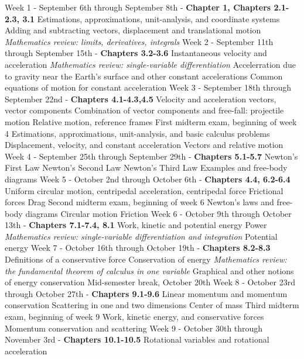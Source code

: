 \documentclass[10pt]{article}
\begin{document}
\begin{outline}[enumerate]
\1 Week 1 - September 6th through September 8th - \textbf{Chapter 1, Chapters 2.1-2.3, 3.1}
\2 Estimations, approximations, unit-analysis, and coordinate systems
\2 Adding and subtracting vectors, displacement and translational motion
\2 \textit{Mathematics review: limits, derivatives, integrals}
\1 Week 2 - September 11th through September 15th - \textbf{Chapters 3.2-3.6}
\2 Instantaneous velocity and acceleration
\3 \textit{Mathematics review: single-variable differentiation}
\2 Accelerration due to gravity near the Earth's surface and other constant accelerations
\2 Common equations of motion for constant acceleration	
\1 Week 3 - September 18th through September 22nd - \textbf{Chapters 4.1-4.3,4.5}
\2 Velocity and acceleration vectors, vector components
\2 Combination of vector components and free-fall: projectile motion
\2 Relative motion, reference frames
\1 First midterm exam, beginning of week 4
\2 Estimations, approximations, unit-analysis, and basic calculus problems
\2 Displacement, velocity, and constant acceleration
\2 Vectors and relative motion
\1 Week 4 - September 25th through September 29th - \textbf{Chapters 5.1-5.7}
\2 Newton's First Law
\2 Newton's Second Law
\2 Newton's Third Law
\2 Examples and free-body diagrams
\1 Week 5 - October 2nd through October 6th - \textbf{Chapters 4.4, 6.2-6.4}
\2 Uniform circular motion, centripedal acceleration, centripedal force
\2 Frictional forces
\2 Drag
\clearpage
\1 Second midterm exam, beginning of week 6
\2 Newton's laws and free-body diagrams
\2 Circular motion
\2 Friction
\1 Week 6 - October 9th through October 13th - \textbf{Chapters 7.1-7.4, 8.1}
\2 Work, kinetic and potential energy
\2 Power
\3 \textit{Mathematics review: single-variable differentiation and integration}
\2 Potential energy
\1 Week 7 - October 16th through October 19th - \textbf{Chapters 8.2-8.3}
\2 Definitions of a conservative force
\2 Conservation of energy
\3 \textit{Mathematics review: the fundamental theorem of calculus in one variable}
\3 Graphical and other notions of energy conservation
\1 Mid-semester break, October 20th
\1 Week 8 - October 23rd through October 27th - \textbf{Chapters 9.1-9.6}
\2 Linear momentum and momentum conservation
\2 Scattering in one and two dimensions
\2 Center of mass
\1 Third midterm exam, beginning of week 9
\2 Work, kinetic energy, and conservative forces
\2 Momentum conservation and scattering
\1 Week 9 - October 30th through November 3rd - \textbf{Chapters 10.1-10.5}
\2 Rotational variables and rotational acceleration

\end{outline}
\end{document}
